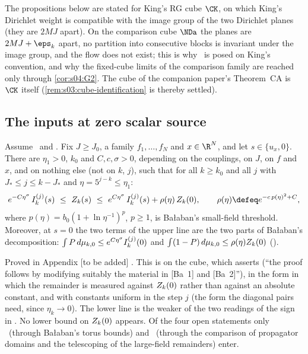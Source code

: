 \begin{remark}\label{rem:k01:cube}
The propositions below are stated for King's RG cube $\CK$, on which King's Dirichlet weight is compatible with the image group of the two Dirichlet planes (they are $2MJ$ apart). On the comparison cube $\NDa$ the planes are $2MJ+\eps_k$ apart, no partition into consecutive blocks is invariant under the image group, and the flow does not exist; this is why \EC\ is posed on King's convention, and why the fixed-cube limits of the comparison family are reached only through \cref{cor:s04:G2}. The cube of the companion paper's Theorem~CA is $\CK$ itself (\cref{rem:s03:cube-identification} is thereby settled).
\end{remark}

\subsection{The inputs at zero scalar source}\label{ssec:k01:inputs}

\begin{proposition}\label{prop:k01:H0rel}
Assume \BALint\ and \RENorb. Fix $J\ge J_0$, a family $f_1,\dots,f_N$ and $x\in\R^N$, and let $s\in\{u_x,0\}$. There are $\eta_1>0$, $k_0$ and $C,c,\sigma>0$, depending on the couplings, on $J$, on $f$ and $x$, and on nothing else (not on $k$, $j$), such that for all $k\ge k_0$ and all $j$ with $J_*\le j\le k-J_*$ and $\eta=5^{j-k}\le\eta_1$:
\begin{equation}\label{eq:k01:H0rel}
e^{-C\eta^{\sigma}}\,\Ik{j}(s)\ \le\ \Zk(s)\ \le\ e^{C\eta^{\sigma}}\,\Ik{j}(s)+\rho(\eta)\,\Zk(0),\qquad \rho(\eta)\defeq e^{-c\,p(\eta)^2+C},
\end{equation}
where $p(\eta)=b_0(1+\ln\eta^{-1})^{p}$, $p\ge1$, is Ba{\l}aban's small-field threshold. Moreover, at $s=0$ the two terms of the upper line are the two parts of Ba{\l}aban's decomposition: $\int P\,d\mu_{k,0}\le e^{C\eta^\sigma}I^{(j)}_{k}(0)$ and $\int(1-P)\,d\mu_{k,0}\le\rho(\eta)Z_{k}(0)$ \textup{(\Rzero)}.
\end{proposition}
Proved in Appendix [to be added] . This is \cite[Thm.~3.1]{K1} on the cube, which \cite[Sect.~5.2]{K2} asserts (``the proof follows by modifying suitably the material in [Ba~1] and [Ba~2]''), in the form in which the remainder is measured against $Z_{k}(0)$ rather than against an absolute constant, and with constants uniform in the step $j$ (the form the diagonal pairs need, since $\eta_k\to0$). The lower line is the weaker of the two readings of the sign in \cite[(3.3)]{K1}. No lower bound on $Z_{k}(0)$ appears. Of the four open statements only \BALint\ (through Ba{\l}aban's torus bounds) and \RENorb\ (through the comparison of propagator domains and the telescoping of the large-field remainders) enter.


